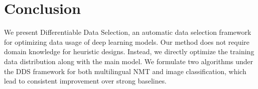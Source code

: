 \section{\label{sec:conclusion}Conclusion}
We present Differentiable Data Selection, an automatic data selection framework for optimizing data usage of deep learning models. Our method does not require domain knowledge for heuristic designs. Instead, we directly optimize the training data distribution along with the main model. We formulate two algorithms under the DDS framework for both multilingual NMT and image classification, which lead to consistent improvement over strong baselines. 

